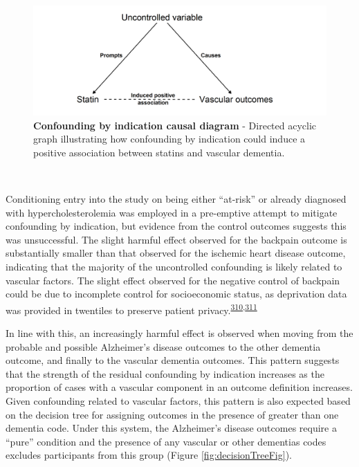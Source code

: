 \documentclass[a4paper, twoside]{templates/ociamthesis}
\begin{document}
\begin{figure}[H]

{\centering \includegraphics[width=0.8\linewidth]{figures/cprd-analysis/indicationBias} 

}

\caption[Confounding by indication causal diagram]{\textbf{Confounding by indication causal diagram} - Directed acyclic graph illustrating how confounding by indication could induce a positive association between statins and vascular dementia.}\label{fig:indicationBias}
\end{figure}

~

Conditioning entry into the study on being either ``at-risk'' or already diagnosed with hypercholesterolemia was employed in a pre-emptive attempt to mitigate confounding by indication, but evidence from the control outcomes suggests this was unsuccessful. The slight harmful effect observed for the backpain outcome is substantially smaller than that observed for the ischemic heart disease outcome, indicating that the majority of the uncontrolled confounding is likely related to vascular factors. The slight effect observed for the negative control of backpain could be due to incomplete control for socioeconomic status, as deprivation data was provided in twentiles to preserve patient privacy.\textsuperscript{\protect\hyperlink{ref-boruzs2016}{310},\protect\hyperlink{ref-ikeda2019}{311}}

In line with this, an increasingly harmful effect is observed when moving from the probable and possible Alzheimer's disease outcomes to the other dementia outcome, and finally to the vascular dementia outcomes. This pattern suggests that the strength of the residual confounding by indication increases as the proportion of cases with a vascular component in an outcome definition increases. Given confounding related to vascular factors, this pattern is also expected based on the decision tree for assigning outcomes in the presence of greater than one dementia code. Under this system, the Alzheimer's disease outcomes require a ``pure'' condition and the presence of any vascular or other dementias codes excludes participants from this group (Figure \ref{fig:decisionTreeFig}).
\end{document}
